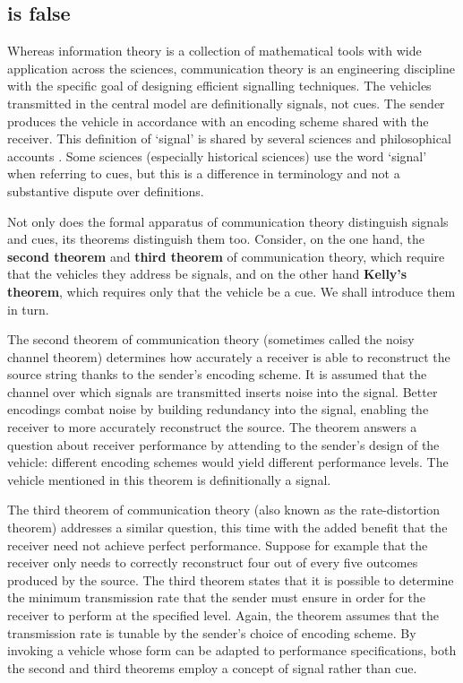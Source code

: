 \subsection{\act{} is false}

Whereas information theory is a collection of mathematical tools with wide application across the sciences, communication theory is an engineering discipline with the specific goal of designing efficient signalling techniques.
The vehicles transmitted in the central model are definitionally signals, not cues.
The sender produces the vehicle in accordance with an encoding scheme shared with the receiver.
This definition of `signal' is shared by several sciences \citep{shannon1948mathematicalc,maynardsmith2003animal} and philosophical accounts \citep[$\S$6]{millikan2004varieties} \citep{bergstrom2011transmission}.
Some sciences (especially historical sciences) use the word `signal' when referring to cues, but this is a difference in terminology and not a substantive dispute over definitions.

Not only does the formal apparatus of communication theory distinguish signals and cues, its theorems distinguish them too.
Consider, on the one hand, the \textbf{second theorem} and \textbf{third theorem} of communication theory, which require that the vehicles they address be signals, and on the other hand \textbf{Kelly's theorem}, which requires only that the vehicle be a cue.
We shall introduce them in turn.

The second theorem of communication theory (sometimes called the noisy channel theorem) determines how accurately a receiver is able to reconstruct the source string thanks to the sender's encoding scheme.
It is assumed that the channel over which signals are transmitted inserts noise into the signal.
Better encodings combat noise by building redundancy into the signal, enabling the receiver to more accurately reconstruct the source.
The theorem answers a question about receiver performance by attending to the sender's design of the vehicle: different encoding schemes would yield different performance levels.
The vehicle mentioned in this theorem is definitionally a signal.

The third theorem of communication theory (also known as the rate-distortion theorem) addresses a similar question, this time with the added benefit that the receiver need not achieve perfect performance.
Suppose for example that the receiver only needs to correctly reconstruct four out of every five outcomes produced by the source.
The third theorem states that it is possible to determine the minimum transmission rate that the sender must ensure in order for the receiver to perform at the specified level.
Again, the theorem assumes that the transmission rate is tunable by the sender's choice of encoding scheme.
By invoking a vehicle whose form can be adapted to performance specifications, both the second and third theorems employ a concept of signal rather than cue.


